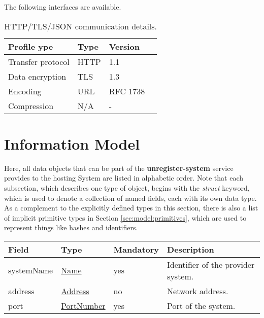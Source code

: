 \documentclass[a4paper]{arrowhead}
\newcommand{\pref}[1]{{\textcolor{ArrowheadGrey}{\hyperref[sec:model:primitives:#1]{#1}}}}
\begin{document}
The following interfaces are available.


\begin{table}[ht!]
  \centering
  \begin{tabular}{|l|l|l|l|}
    \rowcolor{gray!33} Profile ype & Type & Version \\ \hline
    Transfer protocol & HTTP & 1.1 \\ \hline
    Data encryption & TLS & 1.3 \\ \hline
    Encoding & URL & RFC 1738 \\ \hline
    Compression & N/A & - \\ \hline
  \end{tabular}
  \caption{HTTP/TLS/JSON communication details.}
  \label{tab:comunication_semantics_profile}
\end{table}

\clearpage

\section{Information Model}
\label{sec:model}

Here, all data objects that can be part of the \textbf{unregister-system} service
provides to the hosting System are listed in alphabetic order.
Note that each subsection, which describes one type of object, begins with the \textit{struct} keyword, which is used to denote a collection of named fields, each with its own data type.
As a complement to the explicitly defined types in this section, there is also a list of implicit primitive types in Section \ref{sec:model:primitives}, which are used to represent things like hashes and identifiers.

 
\begin{table}[ht!]
\begin{tabularx}{\textwidth}{| p{3cm} | p{3cm} | p{2cm} | X |} \hline
\rowcolor{gray!33} Field & Type & Mandatory & Description \\ \hline
systemName & \pref{Name} & yes & Identifier of the provider system. \\ \hline
address & \pref{Address} & no & Network address. \\ \hline
port &\pref{PortNumber} & yes & Port of the system. \\ \hline
\end{tabularx}
\end{table}
\end{document}
